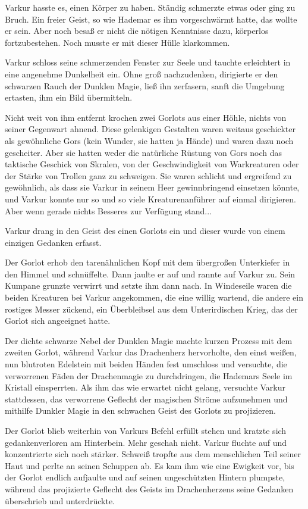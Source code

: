 Varkur hasste es, einen Körper zu haben. Ständig schmerzte etwas oder ging zu Bruch. Ein freier Geist, so wie Hademar es ihm vorgeschwärmt hatte, das wollte er sein. Aber noch besaß er nicht die nötigen Kenntnisse dazu, körperlos fortzubestehen. Noch musste er mit dieser Hülle klarkommen.

Varkur schloss seine schmerzenden Fenster zur Seele und tauchte erleichtert in eine angenehme Dunkelheit ein. Ohne groß nachzudenken, dirigierte er den schwarzen Rauch der Dunklen Magie, ließ ihn zerfasern, sanft die Umgebung ertasten, ihm ein Bild übermitteln.

Nicht weit von ihm entfernt krochen zwei Gorlots aus einer Höhle, nichts von seiner Gegenwart ahnend. Diese gelenkigen Gestalten waren weitaus geschickter als gewöhnliche Gors (kein Wunder, sie hatten ja Hände) und waren dazu noch gescheiter. Aber sie hatten weder die natürliche Rüstung von Gors noch das taktische Geschick von Skralen, von der Geschwindigkeit von Warkreaturen oder der Stärke von Trollen ganz zu schweigen. Sie waren schlicht und ergreifend zu gewöhnlich, als dass sie Varkur in seinem Heer gewinnbringend einsetzen könnte, und Varkur konnte nur so und so viele Kreaturenanführer auf einmal dirigieren. Aber wenn gerade nichts Besseres zur Verfügung stand...

Varkur drang in den Geist des einen Gorlots ein und dieser wurde von einem einzigen Gedanken erfasst.

Der Gorlot erhob den tarenähnlichen Kopf mit dem übergroßen Unterkiefer in den Himmel und schnüffelte. Dann jaulte er auf und rannte auf Varkur zu. Sein Kumpane grunzte verwirrt und setzte ihm dann nach. In Windeseile waren die beiden Kreaturen bei Varkur angekommen, die eine willig wartend, die andere ein rostiges Messer zückend, ein Überbleibsel aus dem Unterirdischen Krieg, das der Gorlot sich angeeignet hatte.

Der dichte schwarze Nebel der Dunklen Magie machte kurzen Prozess mit dem zweiten Gorlot, während Varkur das Drachenherz hervorholte, den einst weißen, nun blutroten Edelstein mit beiden Händen fest umschloss und versuchte, die verworrenen Fäden der Drachenmagie zu durchdringen, die Hademars Seele im Kristall einsperrten. Als ihm das wie erwartet nicht gelang, versuchte Varkur stattdessen, das verworrene Geflecht der magischen Ströme aufzunehmen und mithilfe Dunkler Magie in den schwachen Geist des Gorlots zu projizieren.

Der Gorlot blieb weiterhin von Varkurs Befehl erfüllt stehen und kratzte sich gedankenverloren am Hinterbein. Mehr geschah nicht. Varkur fluchte auf und konzentrierte sich noch stärker. Schweiß tropfte aus dem menschlichen Teil seiner Haut und perlte an seinen Schuppen ab. Es kam ihm wie eine Ewigkeit vor, bis der Gorlot endlich aufjaulte und auf seinen ungeschützten Hintern plumpste, während das projizierte Geflecht des Geists im Drachenherzens seine Gedanken überschrieb und unterdrückte.

